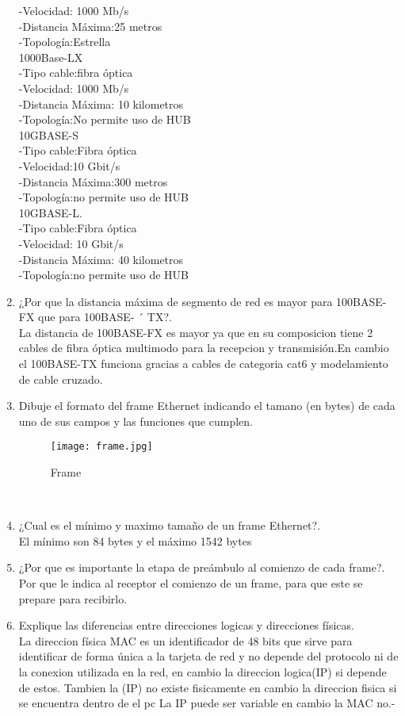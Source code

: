 \documentclass{udparticle}
\begin{document}
\begin{enumerate}
        -Velocidad: 1000 Mb/s\\
        -Distancia Máxima:25 metros\\
        -Topología:Estrella\\ 
    1000Base-LX\\
        -Tipo cable:fibra óptica\\
        -Velocidad: 1000 Mb/s\\
        -Distancia Máxima: 10 kilometros\\
        -Topología:No permite uso de HUB\\
    10GBASE-S\\
        -Tipo cable:Fibra óptica\\
        -Velocidad:10 Gbit/s\\
        -Distancia Máxima:300 metros\\
        -Topología:no permite uso de HUB\\
    10GBASE-L.\\
        -Tipo cable:Fibra óptica\\
        -Velocidad:  10 Gbit/s\\
        -Distancia Máxima: 40 kilometros\\
        -Topología:no permite uso de HUB\\

\item ¿Por que la distancia máxima de segmento de red es mayor para 100BASE-FX que para 100BASE- ´
TX?.\\
  La distancia de 100BASE-FX es mayor ya que en su composicion tiene 2 cables de fibra óptica multimodo para la recepcion y
  transmisión.En cambio el 100BASE-TX funciona gracias a cables de categoria cat6 y modelamiento de cable cruzado.

\item Dibuje el formato del frame Ethernet indicando el tamano (en bytes) de cada uno de sus campos
y las funciones que cumplen.\\
\begin{figure}[H]
	\centering
	\texttt{[image: frame.jpg]}
	\caption{Frame}
\end{figure}\\
\item ¿Cual es el mínimo y maximo tamaño de un frame Ethernet?.\\
    El mínimo son 84 bytes y el máximo 1542 bytes
\item ¿Por que es importante la etapa de preámbulo al comienzo de cada frame?.\\
    Por que le indica al receptor el comienzo de un frame, para que este se prepare para recibirlo.
\item Explique las diferencias entre direcciones logicas y direcciones físicas.\\
    La direccion física MAC es un identificador de 48 bits que sirve para identificar de forma única a la tarjeta de red y no depende 
    del protocolo ni de la conexion utilizada en la red, en cambio la direccion logica(IP) si depende de estos.
    Tambien la (IP) no existe fisicamente en cambio la direccion fisica si se encuentra dentro de el pc
    La IP puede ser  variable en cambio la MAC no.-
    

\end{enumerate}
\end{document}
